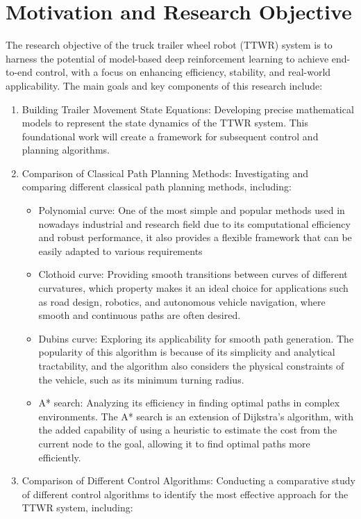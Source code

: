 \chapter{\leavevmode\newline Motivation and Research Objective}
\label{chap:chapter_2}

The research objective of the truck trailer wheel robot (TTWR) system is to harness the potential of model-based deep reinforcement learning to achieve end-to-end control, with a focus on enhancing efficiency, stability, and real-world applicability. The main goals and key components of this research include:
\begin{enumerate}
   \item Building Trailer Movement State Equations: Developing precise mathematical models to represent the state dynamics of the TTWR system. This foundational work will create a framework for subsequent control and planning algorithms.
   \item Comparison of Classical Path Planning Methods: Investigating and comparing different classical path planning methods, including:
   \begin{itemize}
     \item Polynomial curve: One of the most simple and popular methods used in nowadays industrial and research field due to its computational efficiency and robust performance, it also provides a flexible framework that can be easily adapted to various requirements
     \item Clothoid curve: Providing smooth transitions between curves of different curvatures, which property makes it an ideal choice for applications such as road design, robotics, and autonomous vehicle navigation, where smooth and continuous paths are often desired.
     \item Dubins curve: Exploring its applicability for smooth path generation. The popularity of this algorithm is because of its simplicity and analytical tractability, and the algorithm also considers the physical constraints of the vehicle, such as its minimum turning radius.
     \item A* search: Analyzing its efficiency in finding optimal paths in complex environments. The A* search is an extension of Dijkstra's algorithm, with the added capability of using a heuristic to estimate the cost from the current node to the goal, allowing it to find optimal paths more efficiently.
   \end{itemize}
   \item Comparison of Different Control Algorithms: Conducting a comparative study of different control algorithms to identify the most effective approach for the TTWR system, including:

\end{enumerate}
